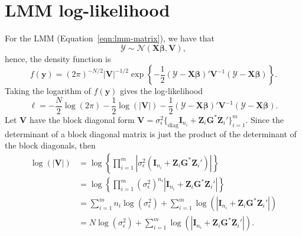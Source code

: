 \documentclass[cmfont,usenames,dvipsnames,leqno]{afit-etd}\usepackage[]{graphicx}\usepackage[]{color}
\begin{document}
\section{LMM log-likelihood}
\label{eqn:lmm-log-likelihood}
For the LMM (Equation~\eqref{eqn:lmm-matrix}), we have that
\begin{equation*}
  \boldsymbol{\mathcal{Y}} \sim \mathcal{N}\left(\boldsymbol{X}\boldsymbol{\beta}, \boldsymbol{V}\right),
\end{equation*}
hence, the density function is
\begin{equation*}
  f(\boldsymbol{y}) = \left(2\pi\right)^{-N/2}\left|\boldsymbol{V}\right|^{-1/2}\exp\left\{-\frac{1}{2}\left(\boldsymbol{\mathcal{Y}} - \boldsymbol{X}\boldsymbol{\beta}\right)'\boldsymbol{V}^{-1}\left(\boldsymbol{\mathcal{Y}} - \boldsymbol{X}\boldsymbol{\beta}\right)\right\}.
\end{equation*}
Taking the logarithm of $f(\boldsymbol{y})$ gives the log-likelihood 
\begin{equation*}
  \ell = -\frac{N}{2}\log(2\pi) - \frac{1}{2}\log\left(\left|\boldsymbol{V}\right|\right) - \frac{1}{2}\left(\boldsymbol{\mathcal{Y}} - \boldsymbol{X}\boldsymbol{\beta}\right)'\boldsymbol{V}^{-1}\left(\boldsymbol{\mathcal{Y}} - \boldsymbol{X}\boldsymbol{\beta}\right).
\end{equation*}
Let $\boldsymbol{V}$ have the block diagonal form $\boldsymbol{V} = \sigma_\epsilon^2\Big\{_{\text{diag}} \boldsymbol{I}_{n_i} + \boldsymbol{Z}_i\boldsymbol{G}^*\boldsymbol{Z}_i' \Big\}_{i = 1}^m$. Since the determinant of a block diagonal matrix is just the product of the determinant of the block diagonals, then
\begin{align*}
  \log\left(\left|\boldsymbol{V}\right|\right) &= \log\left\{\prod_{i=1}^m\left|\sigma_\epsilon^2\left(\boldsymbol{I}_{n_i} + \boldsymbol{Z}_i\boldsymbol{G}^*\boldsymbol{Z}_i'\right)\right|\right\} \\
  &= \log\left\{\prod_{i=1}^m\left(\sigma_\epsilon^2\right)^{n_i}\left|\boldsymbol{I}_{n_i} + \boldsymbol{Z}_i\boldsymbol{G}^*\boldsymbol{Z}_i'\right|\right\} \\
  &= \sum_{i=1}^m n_i \log\left(\sigma_\epsilon^2\right) + \sum_{i=1}^m\log\left(\left|\boldsymbol{I}_{n_i} + \boldsymbol{Z}_i\boldsymbol{G}^*\boldsymbol{Z}_i'\right|\right) \\
  &= N\log\left(\sigma_\epsilon^2\right) + \sum_{i=1}^m\log\left(\left|\boldsymbol{I}_{n_i} + \boldsymbol{Z}_i\boldsymbol{G}^*\boldsymbol{Z}_i'\right|\right).
\end{align*}
\end{document}
